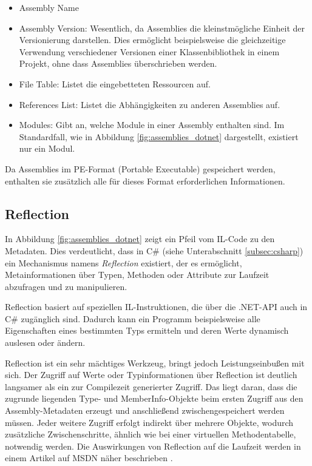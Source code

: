 \begin{itemize}
    \item Assembly Name
    \item Assembly Version: Wesentlich, da Assemblies die kleinstmögliche Einheit der Versionierung darstellen. Dies ermöglicht beispielsweise die gleichzeitige Verwendung verschiedener Versionen einer Klassenbibliothek in einem Projekt, ohne dass Assemblies überschrieben werden.
    \item File Table: Listet die eingebetteten Ressourcen auf.
    \item References List: Listet die Abhängigkeiten zu anderen Assemblies auf.
    \item Modules: Gibt an, welche Module in einer Assembly enthalten sind. Im Standardfall, wie in Abbildung \ref{fig:assemblies_dotnet} dargestellt, existiert nur ein Modul.
\end{itemize}

Da Assemblies im PE-Format (Portable Executable) \cite{MicrosoftLearn_PEFormat} gespeichert werden, enthalten sie zusätzlich alle für dieses Format erforderlichen Informationen.

\subsection{Reflection}
\label{subsec:reflection}
In Abbildung \ref{fig:assemblies_dotnet} zeigt ein Pfeil vom IL-Code zu den Metadaten. Dies verdeutlicht, dass in C\# (siehe Unterabschnitt \ref{subsec:csharp}) ein Mechanismus namens \textit{Reflection} \cite{MicrosoftLearn_Reflection} existiert, der es ermöglicht, Metainformationen über Typen, Methoden oder Attribute zur Laufzeit abzufragen und zu manipulieren. 

Reflection basiert auf speziellen IL-Instruktionen, die über die .NET-API auch in C\# zugänglich sind. Dadurch kann ein Programm beispielsweise alle Eigenschaften eines bestimmten Typs ermitteln und deren Werte dynamisch auslesen oder ändern. 

Reflection ist ein sehr mächtiges Werkzeug, bringt jedoch Leistungseinbußen mit sich. Der Zugriff auf Werte oder Typinformationen über Reflection ist deutlich langsamer als ein zur Compilezeit generierter Zugriff. Das liegt daran, dass die zugrunde liegenden Type- und MemberInfo-Objekte beim ersten Zugriff aus den Assembly-Metadaten erzeugt und anschließend zwischengespeichert werden müssen. Jeder weitere Zugriff erfolgt indirekt über mehrere Objekte, wodurch zusätzliche Zwischenschritte, ähnlich wie bei einer virtuellen Methodentabelle, notwendig werden. Die Auswirkungen von Reflection auf die Laufzeit werden in einem Artikel auf MSDN näher beschrieben \cite{Pobar2005_PerformancePitfalls}.


